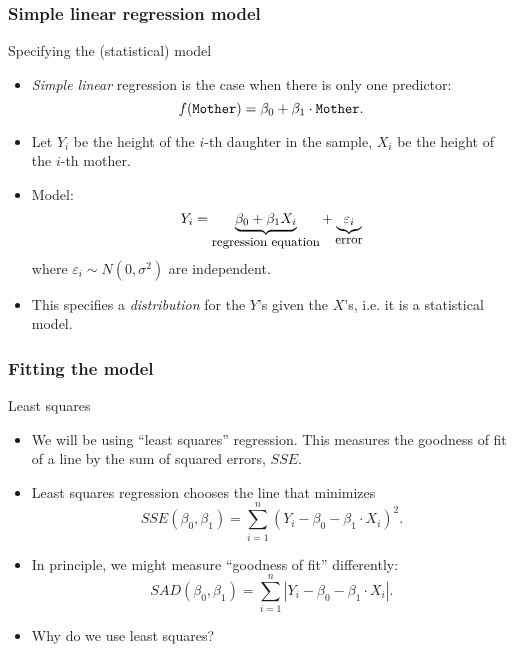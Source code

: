 \documentclass[handout]{beamer}
\begin{document}

   \begin{frame} \frametitle{Simple linear regression model}

   \begin{block}
   {Specifying the (statistical) model}
   \begin{itemize}
   \item
   {\em Simple linear} regression is the case when there is only one predictor:
   $$
   f({\tt Mother}) = \beta_0 + \beta_1  \cdot {\tt Mother}.$$

   \item Let $Y_i$ be the height of the $i$-th daughter in the sample, $X_i$ be the height of the $i$-th mother.


   \item Model:
   $$
   Y_i = \underbrace{\beta_0 + \beta_1 X_i}_{\text{{\small regression equation}}} + \underbrace{\varepsilon_i}_{\text{{\small error}}}$$
   where $\varepsilon_i \sim N(0, \sigma^2)$ are independent.

   \item This specifies a {\em distribution} for the $Y$'s given the $X$'s, i.e.
   it is a statistical model.

   \end{itemize}
   \end{block}
   \end{frame}


   \begin{frame} \frametitle{Fitting the model}

   \begin{block}
   {Least squares}
   \begin{itemize}
   \item We will be using ``least squares'' regression. This measures
   the goodness of fit of a line by the sum of squared errors, $SSE$.
   \item Least squares regression chooses the line that minimizes
   $$
   SSE(\beta_0, \beta_1) = \sum_{i=1}^n (Y_i - \beta_0 - \beta_1 \cdot X_i)^2.$$

   \item In principle, we might measure ``goodness of fit'' differently:
   $$
   SAD(\beta_0, \beta_1) = \sum_{i=1}^n |Y_i - \beta_0 - \beta_1 \cdot X_i|.$$

   \item Why do we use least squares?
   \end{itemize}
   \end{block}
   \end{frame}
\end{document}
